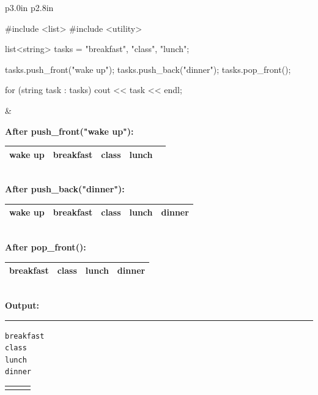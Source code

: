   \begin{center}
    \small
    \begin{tabular}{p{3.0in} p{2.8in}}
      \begin{minipage}{3.0in}
        \begin{cpplst}
#include <list>
#include <utility>

list<string> tasks =
    {"breakfast", "class", "lunch"};

tasks.push_front("wake up");
tasks.push_back("dinner");
tasks.pop_front();

for (string task : tasks) {
    cout << task << endl;
}
        \end{cpplst}
      \end{minipage}
      &
      \begin{minipage}{2.8in}
        \vskip 10pt
        {\bf After push\_front("wake up"):}\\[4pt]
        \begin{tabular}{|c|c|c|c|c|}
          \hline
          wake up & breakfast & class & lunch \\
          \hline
        \end{tabular}\\[8pt]
        {\bf After push\_back("dinner"):}\\[4pt]
        \begin{tabular}{|c|c|c|c|c|}
          \hline
          wake up & breakfast & class & lunch & dinner \\
          \hline
        \end{tabular}\\[8pt]
        {\bf After pop\_front():}\\[4pt]
        \begin{tabular}{|c|c|c|c|}
          \hline
          breakfast & class & lunch & dinner \\
          \hline
        \end{tabular}\\[10pt]
        {\bf Output:}
        \hrule\vskip 5pt
        {\tt breakfast}\\
        {\tt class}\\
        {\tt lunch}\\
        {\tt dinner}
      \end{minipage}
    \end{tabular}
    \vskip 12pt
    \renewcommand{\arraystretch}{1.3}
    \begin{tabular}{|c|c|c|}
      \hline
      \rowcolor{orange!20}

\end{tabular}
\end{center}
